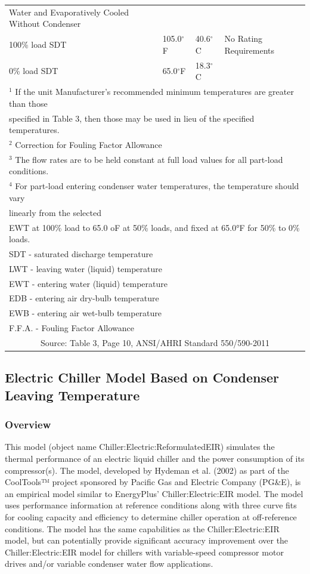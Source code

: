 \begin{longtable}[c]{p{1.2in}p{1.2in}p{1.2in}p{1.2in}p{1.2in}}
\midrule
Water and Evaporatively Cooled Without Condenser & & & & \tabularnewline
100\% load SDT & 105.0\(^{\circ}\)F & 40.6\(^{\circ}\)C & \multicolumn{2}{l}{No Rating Requirements} \tabularnewline
0\% load SDT & 65.0\(^{\circ}\)F & 18.3\(^{\circ}\)C & & \tabularnewline
\bottomrule
\multicolumn{5}{l}{\(^{1}\) If the unit Manufacturer’s recommended minimum temperatures are greater than those} \tabularnewline
\multicolumn{5}{l}{specified in Table 3, then those may be used in lieu of the specified temperatures.} \tabularnewline
\multicolumn{5}{l}{\(^{2}\) Correction for Fouling Factor Allowance} \tabularnewline
\multicolumn{5}{l}{\(^{3}\) The flow rates are to be held constant at full load values for all part-load conditions.} \tabularnewline
\multicolumn{5}{l}{\(^{4}\) For part-load entering condenser water temperatures, the temperature should vary} \tabularnewline
\multicolumn{5}{l}{linearly from the selected} \tabularnewline
\multicolumn{5}{l}{EWT at 100\% load to 65.0 oF at 50\% loads, and fixed at 65.0°F for 50\% to 0\% loads.} \tabularnewline
\multicolumn{5}{l}{SDT - saturated discharge temperature} \tabularnewline
\multicolumn{5}{l}{LWT - leaving water (liquid) temperature} \tabularnewline
\multicolumn{5}{l}{EWT - entering water (liquid) temperature} \tabularnewline
\multicolumn{5}{l}{EDB - entering air dry-bulb temperature} \tabularnewline
\multicolumn{5}{l}{EWB - entering air wet-bulb temperature} \tabularnewline
\multicolumn{5}{l}{F.F.A. - Fouling Factor Allowance} \tabularnewline
\multicolumn{5}{c}{\scriptsize Source: Table 3, Page 10, ANSI/AHRI Standard 550/590-2011}
\end{longtable}

\subsection{Electric Chiller Model Based on Condenser Leaving Temperature}\label{electric-chiller-model-based-on-condenser-leaving-temperature}

\subsubsection{Overview}\label{overview-3-002}

This model (object name Chiller:Electric:ReformulatedEIR) simulates the thermal performance of an electric liquid chiller and the power consumption of its compressor(s). The model, developed by Hydeman et al. (2002) as part of the CoolTools™ project sponsored by Pacific Gas and Electric Company (PG\&E), is an empirical model similar to EnergyPlus' Chiller:Electric:EIR model. The model uses performance information at reference conditions along with three curve fits for cooling capacity and efficiency to determine chiller operation at off-reference conditions. The model has the same capabilities as the Chiller:Electric:EIR model, but can potentially provide significant accuracy improvement over the Chiller:Electric:EIR model for chillers with variable-speed compressor motor drives and/or variable condenser water flow applications.

